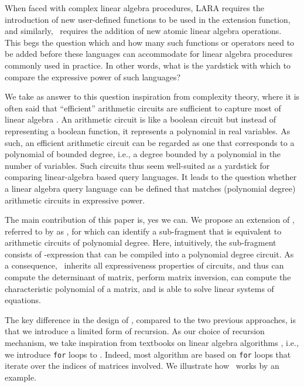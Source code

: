 When faced with complex linear algebra procedures, LARA requires the introduction of new user-defined functions to be used in the extension function, and similarly, \lang\ requires the addition of new atomic linear algebra operations. This begs the question which and how many such functions or operators need to be added before these languages can accommodate for 
linear algebra procedures commonly used in practice. In other words, what is the yardstick with which to compare the expressive power of such languages? 

We take as answer to this question inspiration from complexity theory, where it is often said that ``efficient'' arithmetic circuits are sufficient to capture most of linear algebra \cite{}. An arithmetic circuit is like a boolean circuit but instead of representing a boolean function, it represents a polynomial in real variables. As such, an efficient arithmetic circuit can be regarded as one that corresponds to a polynomial of bounded degree, i.e., a degree bounded by a polynomial in the number of variables. Such circuits thus seem well-suited as a yardstick for comparing  linear-algebra based query languages. It leads to the question whether a linear algebra query language can be defined that matches (polynomial degree) arithmetic circuits in expressive power.

The main contribution of this paper is, yes we can. We propose an extension of \lang, referred to by as \langfor, for which can identify a sub-fragment that is equivalent to arithmetic circuits of polynomial degree. Here, intuitively, the sub-fragment consists of \langfor-expression that can be compiled into a polynomial degree circuit. As a consequence, \langfor\ inherits all expressiveness properties of circuits, and thus can compute the determinant of matrix, perform matrix inversion, can compute the characteristic polynomial of a matrix, and is able to solve linear systems of equations.

The key difference in the design of \langfor, compared to the two previous approaches, is that we introduce a limited form of recursion. As our choice of recursion mechanism, we take inspiration from textbooks on linear algebra algorithms \cite{}, i.e., we introduce \texttt{for} loops to \lang. Indeed, most algorithm are based on \texttt{for} loops that iterate over the indices of matrices involved. We illustrate how \langfor\ works by an example.



